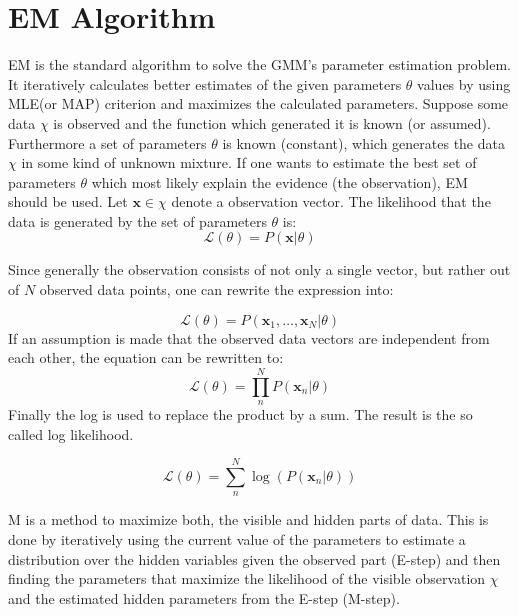 \section{EM Algorithm}
EM is the standard algorithm to solve the GMM's parameter estimation problem. It iteratively calculates better estimates of the given parameters $\theta$ values by using MLE(or MAP) criterion and maximizes the calculated parameters. 
Suppose some data $\chi$ is observed and the function which generated it is known (or assumed). Furthermore a set of parameters $\theta$ is known (constant), which generates the data $\chi$ in some kind of unknown mixture.
If one wants to estimate the best set of parameters $\theta$ which most likely explain the evidence (the observation), EM should be used. 
Let $\mathbf{x} \in \chi$ denote a observation vector. The likelihood that the data is generated by the set of parameters $\theta$ is:
\begin{equation}
\label{eq:singvecmle}
\mathcal{L}(\theta) = P \left( \mathbf{x} | \theta \right)
\end{equation}

Since generally the observation consists of not only a single vector, but rather out of $N$ observed data points, one can rewrite the expression into:

\begin{equation}
\label{eq:xntotheta}
\mathcal{L} \left( \theta \right) = P \left( \mathbf{x}_1 , \ldots , \mathbf{x}_N | \theta \right)
\end{equation}
If an assumption is made that the observed data vectors are independent from each other, the equation can be rewritten to:
\begin{equation*}
\mathcal{L} \left( \theta \right) = \prod\limits_n^N P \left( \mathbf{x}_n | \theta \right)
\end{equation*}
Finally the log is used to replace the product by a sum. The result is the so called log likelihood.

\begin{equation}
\label{eq:loglikelihood}
\mathcal{L} \left( \theta \right) = \sum\limits_n^N  \log \left( P \left( \mathbf{x}_n | \theta \right) \right)
\end{equation}

M is a method to maximize both, the visible and hidden parts of data.  
This is done by iteratively using the current value of the parameters to estimate a distribution over the hidden variables given the observed part (E-step) and then finding the parameters that maximize the likelihood of the visible observation $\chi$ and the estimated hidden parameters from the E-step (M-step).

